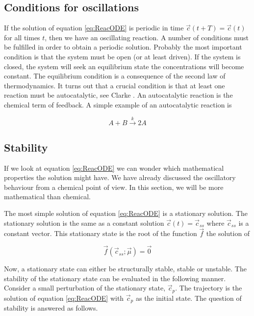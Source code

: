 \subsection{Conditions for oscillations}
If the solution of equation \eqref{eq:ReacODE} is periodic in time \ie
$\vec{c}(t+T) = \vec{c}(t)$ for all times $t$, then we have an
oscillating reaction. A number of conditions must be fulfilled in
order to obtain a periodic solution. Probably the most important
condition is that the system must be open (or at least driven). If the
system is closed, the system will seek an equilibrium state \ie the
concentrations will become constant. The equilibrium condition is a
consequence of the second law of thermodynamics. It turns out that a
crucial condition is that at least one reaction must be
autocatalytic, see \eg Clarke \cite{Clarke80}. An autocatalytic
reaction is the chemical term of feedback. A simple example of an
autocatalytic reaction is 

\begin{equation}
\label{eq:SimpleReac}
  A + B \overset{k}{\rightarrow} 2A
\end{equation}


\subsection{Stability}
If we look at equation \eqref{eq:ReacODE} we can wonder which
mathematical properties the solution might have. We have already
discussed the oscillatory behaviour from a chemical point of view. In
this section, we will be more mathematical than chemical.

The most simple solution of equation \eqref{eq:ReacODE} is a
stationary solution. The stationary solution is the same as a constant
solution \ie $\vec{c}(t) = \vec{c}_{ss}$ where $\vec{c}_{ss}$ is a
constant vector. This stationary state is the root of the function
$\vec{f}$ \ie the solution of

\begin{equation}
  \vec{f}(\vec{c}_{ss}; \vec{\mu}) = \vec{0}
\end{equation}

Now, a stationary state can either be structurally stable, stable or
unstable. The stability of the stationary state can be evaluated in the 
following manner. Consider a small perturbation of the stationary
state, $\vec{c}_p$. The trajectory is the
solution of equation \eqref{eq:ReacODE} with $\vec{c}_p$ as the
initial state. The question of stability is answered as follows.

